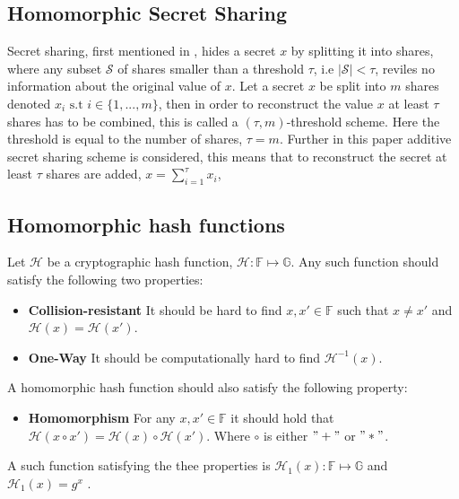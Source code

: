 \subsection*{Homomorphic Secret Sharing}
Secret sharing, first mentioned in \cite{How_share_A_secret}, hides a secret $x$ by splitting it into shares, where any subset $\mathcal{S}$ of shares smaller than a threshold $\tau$, i.e $|\mathcal{S}|<\tau$, reviles no information about the original value of $x$.  Let a secret $x$ be split into $m$ shares denoted $x_i \text{ s.t } i\in\{1,...,m\}$, then in order to reconstruct the value $x$ at least $\tau$ shares has to be combined, this is called a $(\tau,m)$-threshold scheme. Here the threshold is equal to the number of shares,  $\tau=m$. Further in this paper additive secret sharing scheme is considered, this means that to reconstruct the secret at least $\tau$ shares are added, $x = \sum_{i=1}^\tau x_i$,

\subsection*{Homomorphic hash functions}
Let $\mathcal{H}$ be a cryptographic hash function, $\mathcal{H}:\mathds{F}\mapsto \mathds{G}$. Any such function should satisfy the following two properties:
\begin{itemize}
    \item \textbf{Collision-resistant} It should be hard to find $x,x'\in\mathds{F}$ such that $x\neq x'$ and $\mathcal{H}(x)=\mathcal{H}(x')$.
    \item \textbf{One-Way} It should be computationally hard to find $\mathcal{H}^{-1}(x)$.
\end{itemize}

A homomorphic hash function should also satisfy the following property:
\begin{itemize}
    \item \textbf{Homomorphism} For any $x,x'\in\mathds{F}$ it should hold that $\mathcal{H}(x\circ x') = \mathcal{H}(x)\circ\mathcal{H}(x')$. Where $\circ$ is either $"+"$ or $"*"$.
\end{itemize}

A such function satisfying the thee properties is $\mathcal{H}_1(x):\mathds{F}\mapsto\mathds{G}$ and $\mathcal{H}_1(x)= g^{x}$ \cite{HHF}. 


